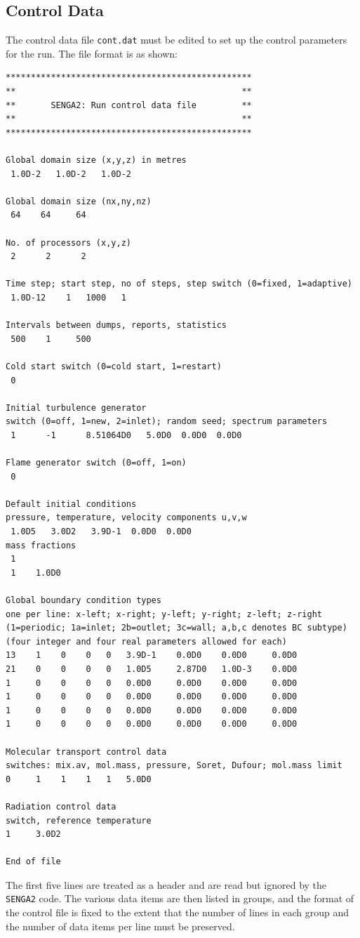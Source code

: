 \documentclass[dvips]{article}
\begin{document}
\subsection{Control Data}
The control data file {\tt cont.dat} must be edited to set up
the control parameters for the run.  The file format is as shown:
\begin{verbatim}
*************************************************
**                                             **
**       SENGA2: Run control data file         **
**                                             **
*************************************************

Global domain size (x,y,z) in metres
 1.0D-2   1.0D-2   1.0D-2

Global domain size (nx,ny,nz)
 64    64     64

No. of processors (x,y,z)
 2      2      2

Time step; start step, no of steps, step switch (0=fixed, 1=adaptive)
 1.0D-12    1   1000   1

Intervals between dumps, reports, statistics
 500    1     500

Cold start switch (0=cold start, 1=restart)
 0

Initial turbulence generator
switch (0=off, 1=new, 2=inlet); random seed; spectrum parameters
 1      -1      8.51064D0   5.0D0  0.0D0  0.0D0

Flame generator switch (0=off, 1=on) 
 0

Default initial conditions
pressure, temperature, velocity components u,v,w
 1.0D5   3.0D2   3.9D-1  0.0D0  0.0D0
mass fractions
 1
 1    1.0D0

Global boundary condition types
one per line: x-left; x-right; y-left; y-right; z-left; z-right
(1=periodic; 1a=inlet; 2b=outlet; 3c=wall; a,b,c denotes BC subtype)
(four integer and four real parameters allowed for each)
13    1    0    0   0   3.9D-1    0.0D0    0.0D0     0.0D0
21    0    0    0   0   1.0D5     2.87D0   1.0D-3    0.0D0
1     0    0    0   0   0.0D0     0.0D0    0.0D0     0.0D0
1     0    0    0   0   0.0D0     0.0D0    0.0D0     0.0D0
1     0    0    0   0   0.0D0     0.0D0    0.0D0     0.0D0
1     0    0    0   0   0.0D0     0.0D0    0.0D0     0.0D0

Molecular transport control data
switches: mix.av, mol.mass, pressure, Soret, Dufour; mol.mass limit
0     1    1    1   1   5.0D0

Radiation control data
switch, reference temperature
1     3.0D2

End of file
\end{verbatim}
The first five lines are treated as a header and are read but ignored by
the {\tt SENGA2} code.  The various data items are then listed in groups,
and the
format of the control file is fixed to the extent that the number of lines
in each group and the number of data items per line must be preserved.\\
\end{document}
